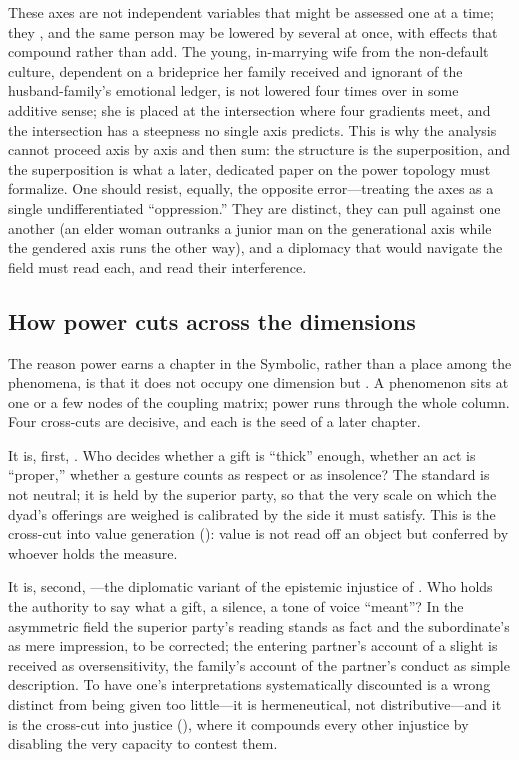  These axes are not independent variables that might be assessed one at a time; they , and the same person may be lowered by several at once, with effects that compound rather than add. The young, in-marrying wife from the non-default culture, dependent on a brideprice her family received and ignorant of the husband-family's emotional ledger, is not lowered four times over in some additive sense; she is placed at the intersection where four gradients meet, and the intersection has a steepness no single axis predicts. This is why the analysis cannot proceed axis by axis and then sum: the structure is the superposition, and the superposition is what a later, dedicated paper on the power topology must formalize. One should resist, equally, the opposite error---treating the axes as a single undifferentiated ``oppression.'' They are distinct, they can pull against one another (an elder woman outranks a junior man on the generational axis while the gendered axis runs the other way), and a diplomacy that would navigate the field must read each, and read their interference.

\subsection{How power cuts across the dimensions}
The reason power earns a chapter in the Symbolic, rather than a place among the phenomena, is that it does not occupy one dimension but . A phenomenon sits at one or a few nodes of the coupling matrix; power runs through the whole column. Four cross-cuts are decisive, and each is the seed of a later chapter.

It is, first, . Who decides whether a gift is ``thick'' enough, whether an act is ``proper,'' whether a gesture counts as respect or as insolence? The standard is not neutral; it is held by the superior party, so that the very scale on which the dyad's offerings are weighed is calibrated by the side it must satisfy. This is the cross-cut into value generation (): value is not read off an object but conferred by whoever holds the measure.

It is, second, ---the diplomatic variant of the epistemic injustice of . Who holds the authority to say what a gift, a silence, a tone of voice ``meant''? In the asymmetric field the superior party's reading stands as fact and the subordinate's as mere impression, to be corrected; the entering partner's account of a slight is received as oversensitivity, the family's account of the partner's conduct as simple description. To have one's interpretations systematically discounted is a wrong distinct from being given too little---it is hermeneutical, not distributive---and it is the cross-cut into justice (), where it compounds every other injustice by disabling the very capacity to contest them.

